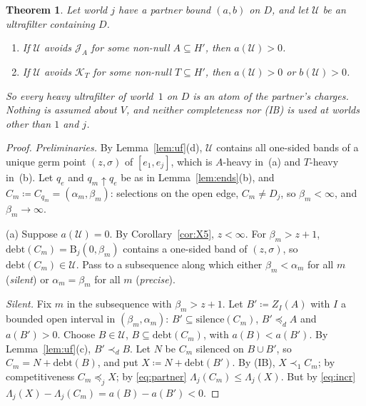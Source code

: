 \documentclass[11pt]{article}
\newtheorem{theorem}{Theorem}
\theoremstyle{definition}\newtheorem{definition}[theorem]{Definition}
\theoremstyle{remark}\newtheorem{remark}[theorem]{Remark}
\newcommand{\debt}{\mathrm{debt}}
\newcommand{\sil}{\mathrm{silence}}
\newcommand{\Band}{\mathrm{B}}
\newcommand{\Jid}{\mathcal J}
\newcommand{\Kid}{\mathcal K}
\newcommand{\Uf}{\mathcal U}
\begin{document}
\begin{theorem}\label{thm:transfer}
Let world $j$ have a partner bound $(a,b)$ on $D$, and let $\Uf$ be an
ultrafilter containing $D$.
\begin{enumerate}[label=(\alph*)]
\item If $\Uf$ avoids $\Jid_A$ for some non-null $A\subseteq H'$, then
$a(\Uf)>0$.
\item If $\Uf$ avoids $\Kid_T$ for some non-null $T\subseteq H'$, then
$a(\Uf)>0$ or $b(\Uf)>0$.
\end{enumerate}
So every heavy ultrafilter of world~$1$ on $D$ is an atom of the partner's
charges. Nothing is assumed about $V$, and neither completeness nor (IB) is
used at worlds other than $1$ and $j$.
\end{theorem}
\begin{proof}
\emph{Preliminaries.} By Lemma~\ref{lem:uf}(d), $\Uf$ contains all one-sided
bands of a unique germ point $(z,\sigma)$ of $[e_1,e_j]$, which is $A$-heavy
in~(a) and $T$-heavy in~(b). Let $q_e$ and $q_m\uparrow q_e$ be as in
Lemma~\ref{lem:ends}(b), and $C_m\coloneqq C_{q_m}=(\alpha_m,\beta_m)$:
selections on the open edge, $C_m\ne D_j$, so $\beta_m<\infty$, and
$\beta_m\to\infty$.

(a) Suppose $a(\Uf)=0$. By Corollary~\ref{cor:X5}, $z<\infty$. For
$\beta_m>z+1$, $\debt(C_m)=\Band_j(0,\beta_m)$ contains a one-sided band of
$(z,\sigma)$, so $\debt(C_m)\in\Uf$. Pass to a subsequence along which either
$\beta_m<\alpha_m$ for all $m$ (\emph{silent}) or $\alpha_m=\beta_m$ for all
$m$ (\emph{precise}).

\emph{Silent.} Fix $m$ in the subsequence with $\beta_m>z+1$. Let $B'\coloneqq Z_I(A)$ with $I$
a bounded open interval in $(\beta_m,\alpha_m)$: $B'\subseteq\sil(C_m)$,
$B'\preceq_dA$ and $a(B')>0$. Choose $B\in\Uf$, $B\subseteq\debt(C_m)$, with
$a(B)<a(B')$. By Lemma~\ref{lem:uf}(c), $B'\prec_dB$. Let $N$ be $C_m$
silenced on $B\cup B'$, so $C_m=N+\debt(B)$, and put $X\coloneqq
N+\debt(B')$. By (IB), $X\prec_1C_m$; by competitiveness $C_m\preceq_jX$; by
\eqref{eq:partner} $\Lambda_j(C_m)\le\Lambda_j(X)$. But by \eqref{eq:incr}
$\Lambda_j(X)-\Lambda_j(C_m)=a(B)-a(B')<0$.


\end{proof}
\end{document}
